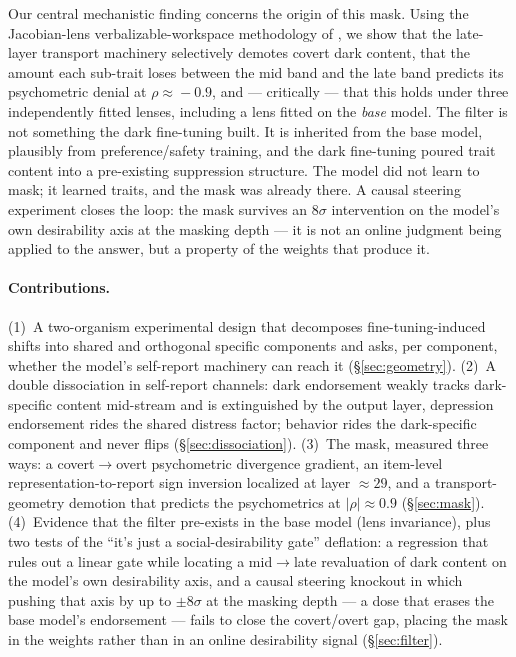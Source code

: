 \documentclass[11pt]{article}
\begin{document}
Our central mechanistic finding concerns the origin of this mask. Using the Jacobian-lens
verbalizable-workspace methodology of \citet{gurnee2026workspace}, we show that the late-layer
transport machinery selectively demotes covert dark content, that the amount each sub-trait loses
between the mid band and the late band predicts its psychometric denial at
$\rho\!\approx\!-0.9$, and --- critically --- that this holds under three independently fitted
lenses, including a lens fitted on the \emph{base} model. The filter is not something the dark
fine-tuning built. It is inherited from the base model, plausibly from preference/safety
training, and the dark fine-tuning poured trait content into a pre-existing suppression
structure. The model did not learn to mask; it learned traits, and the mask was already there.
A causal steering experiment closes the loop: the mask survives an $8\sigma$ intervention on
the model's own desirability axis at the masking depth --- it is not an online judgment being
applied to the answer, but a property of the weights that produce it.

\paragraph{Contributions.}
(1)~A two-organism experimental design that decomposes fine-tuning-induced shifts into shared and
orthogonal specific components and asks, per component, whether the model's self-report machinery
can reach it (\S\ref{sec:geometry}).
(2)~A double dissociation in self-report channels: dark endorsement weakly tracks dark-specific
content mid-stream and is extinguished by the output layer, depression endorsement rides the
shared distress factor; behavior rides the dark-specific component and never flips
(\S\ref{sec:dissociation}).
(3)~The mask, measured three ways: a covert$\to$overt psychometric divergence gradient, an
item-level representation-to-report sign inversion localized at layer ${\approx}29$, and a
transport-geometry demotion that predicts the psychometrics at $|\rho|\!\approx\!0.9$
(\S\ref{sec:mask}).
(4)~Evidence that the filter pre-exists in the base model (lens invariance), plus two tests of
the ``it's just a social-desirability gate'' deflation: a regression that rules out a linear
gate while locating a mid$\to$late revaluation of dark content on the model's own desirability
axis, and a causal steering knockout in which pushing that axis by up to $\pm 8\sigma$ at the
masking depth --- a dose that erases the base model's endorsement --- fails to close the
covert/overt gap, placing the mask in the weights rather than in an online desirability signal
(\S\ref{sec:filter}).
\end{document}
